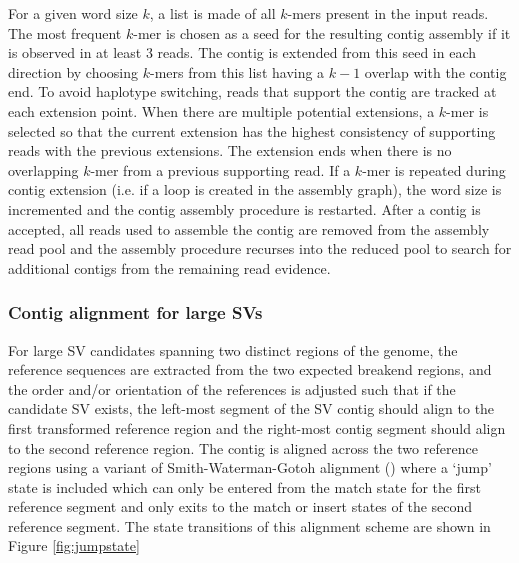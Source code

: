 \documentclass{article}
\begin{document}
For a given word size $k$, a list is made of all $k$-mers present in the input reads. The most frequent $k$-mer is chosen as a seed for the resulting contig assembly if it is observed in at least 3 reads. The contig is extended from this seed in each direction by choosing $k$-mers from this list having a $k-1$ overlap with the contig end. To avoid haplotype switching, reads that support the contig are tracked at each extension point. When there are multiple potential extensions, a $k$-mer is selected so that the current extension has the highest consistency of supporting reads with the previous extensions. The extension ends when there is no overlapping $k$-mer from a previous supporting read. If a $k$-mer is repeated during contig extension (i.e. if a loop is created in the assembly graph), the word size is incremented and the contig assembly procedure is restarted. After a contig is accepted, all reads used to assemble the contig are removed from the assembly read pool and the assembly procedure recurses into the reduced pool to search for additional contigs from the remaining read evidence.

\subsubsection{Contig alignment for large SVs} For large SV candidates spanning two distinct regions of the genome, the reference sequences are extracted from the two expected breakend regions, and the order and/or orientation of the references is adjusted such that if the candidate SV exists, the left-most segment of the SV contig should align to the first transformed reference region and the right-most contig segment should align to the second reference region. The contig is aligned across the two reference regions using a variant of Smith-Waterman-Gotoh alignment (\cite{smith1981,gotoh1982}) where a `jump' state is included which can only be entered from the match state for the first reference segment and only exits to the match or insert states of the second reference segment. The state transitions of this alignment scheme are shown in Figure \ref{fig:jumpstate}
\end{document}
